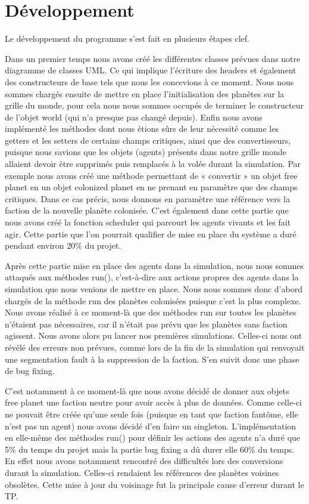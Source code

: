\chapter{Développement}

  Le développement du programme s’est fait en plusieurs étapes clef.

  Dans un premier temps nous avons créé les différentes classes prévues dans notre diagramme de classes UML. Ce qui implique l’écriture des headers et également des constructeurs de base tels que nous les concevions à ce moment. Nous nous sommes chargés ensuite de mettre en place l’initialisation des planètes sur la grille du monde, pour cela nous nous sommes occupés de terminer le constructeur de l’objet world (qui n’a presque pas changé depuis). Enfin nous avons implémenté les méthodes dont nous étions sûrs de leur nécessité comme les getters et les setters de certains champs critiques, ainsi que des convertisseurs, puisque nous savions que les objets (agents) présents dans notre grille monde allaient devoir être supprimés puis remplacés à la volée durant la simulation. Par exemple nous avons créé une méthode permettant de « convertir » un objet free planet en un objet colonized planet en ne prenant en paramètre que des champs critiques. Dans ce cas précis, nous donnons en paramètre une référence vers la faction de la nouvelle planète colonisée. C’est également dans cette partie que nous avons créé la fonction scheduler qui parcourt les agents vivants et les fait agir. Cette partie que l’on pourrait qualifier de mise en place du système a duré pendant environ 20\% du projet.

  Après cette partie mise en place des agents dans la simulation, nous nous sommes attaqués aux méthodes run(), c’est-à-dire aux actions propres des agents dans la simulation que nous venions de mettre en place. Nous nous sommes donc d’abord chargés de la méthode run des planètes colonisées puisque c’est la plus complexe. Nous avons réalisé à ce moment-là que des méthodes run sur toutes les planètes n’étaient pas nécessaires, car il n’était pas prévu que les planètes sans faction agissent. Nous avons alors pu lancer nos premières simulations. Celles-ci nous ont révélé des erreurs non prévues, comme lors de la fin de la simulation qui renvoyait une segmentation fault à la suppression de la faction. S’en suivit donc une phase de bug fixing.

  C’est notamment à ce moment-là que nous avons décidé de donner aux objets free planet une faction neutre pour avoir accès à plus de données. Comme celle-ci ne pouvait être créée qu’une seule fois (puisque en tant que faction fantôme, elle n’est pas un agent) nous avons décidé d’en faire un singleton. L’implémentation en elle-même des méthodes run() pour définir les actions des agents n’a duré que 5\% du temps du projet mais la partie bug fixing a dû durer elle 60\% du temps. En effet nous avons notamment rencontré des difficultés lors des conversions durant la simulation. Celles-ci rendaient les références des planètes voisines obsolètes. Cette mise à jour du voisinage fut la principale cause d’erreur durant le TP.

